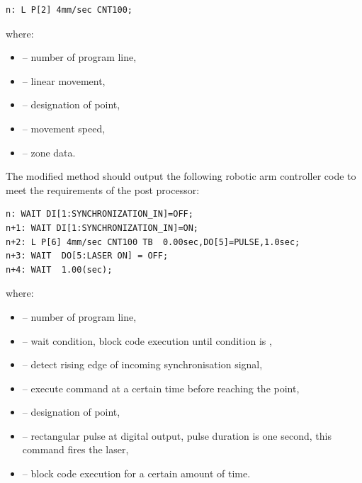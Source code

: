 \begin{lstlisting}[frame=lines,numbers=none,breaklines=true, language={}]
n: L P[2] 4mm/sec CNT100;
\end{lstlisting}


where:

\begin{itemize}

    \item {} -- number of program line, 
    \item {} -- linear movement,
    \item {} -- designation of point,
    \item {} -- movement speed,
    \item {} -- zone data.

\end{itemize}

The modified  method should output the following robotic arm controller code to meet the requirements of the post processor:


\begin{lstlisting}[frame=lines,numbers=none,breaklines=true, language={}]
n: WAIT DI[1:SYNCHRONIZATION_IN]=OFF;
n+1: WAIT DI[1:SYNCHRONIZATION_IN]=ON;
n+2: L P[6] 4mm/sec CNT100 TB  0.00sec,DO[5]=PULSE,1.0sec;
n+3: WAIT  DO[5:LASER ON] = OFF;
n+4: WAIT  1.00(sec);
\end{lstlisting}


where:

\begin{itemize}

    \item {} -- number of program line, 
    \item {} -- wait condition, block code execution until condition  is ,
    \item {} -- detect rising edge of incoming synchronisation signal,
    \item {} -- execute command at a certain time before reaching the point,
    \item {} -- designation of point,
    \item {} -- rectangular pulse at digital output, pulse duration is one second, this command fires the laser,
    \item {} -- block code execution for a certain amount of time.

\end{itemize}

